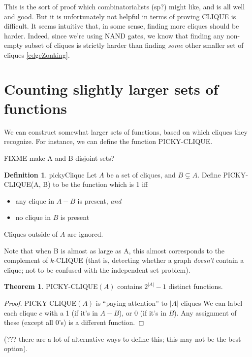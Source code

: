 \documentclass[12pt]{article}
\theoremstyle{definition}
\newtheorem{thm}{Theorem}[section]
\newtheorem{defn}{Definition}[section]
\begin{document}
This is the sort of proof which combinatorialists (sp?)
might like, and is all well and good. But
it is unfortunately not helpful in
terms of proving CLIQUE is difficult.
It seems intuitive that, in some sense, finding more cliques should
be harder.
Indeed, since we're using NAND gates, we know that finding any non-empty
subset of cliques is strictly harder than finding {\em some} other 
smaller set of cliques \ref{edgeZonking}.


\section{Counting slightly larger sets of functions}

We can construct somewhat larger sets of functions, based on
which cliques they recognize. For instance, we can define the
function PICKY-CLIQUE.

FIXME make A and B disjoint sets?

\begin{defn}{pickyClique}
Let $A$ be a set of cliques, and $B \subsetneq A$.
Define PICKY-CLIQUE(A, B) to be the function which is 1 iff

\begin{itemize}

\item any clique in $A-B$ is present, {\em and}

\item no clique in $B$ is present

\end{itemize}
Cliques outside of $A$ are ignored.

\end{defn}

Note that when B is almost as large as A,
this almost corresponds to the complement of
$k$-CLIQUE (that is, detecting whether a graph
{\em doesn't} contain a clique; not to be
confused with the independent set problem).

\begin{thm}
\label{pickyDistinct}
PICKY-CLIQUE$(A)$ contains $2^{|A|} - 1$ distinct functions.
\end{thm}
\begin{proof}
PICKY-CLIQUE$(A)$ is ``paying attention'' to $|A|$ cliques
We can label each clique $c$ with a 1 (if it's in $A-B$),
or 0 (if it's in $B$). Any assignment of these (except all 0's)
is a different function.
\end{proof}

(??? there are a lot of alternative ways to define this;
this may not be the best option).
\end{document}
